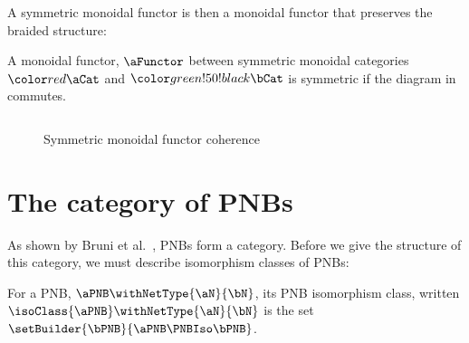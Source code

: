 A symmetric monoidal functor is then a monoidal functor that preserves the
braided structure:

\newcommand{\braidingArgsA}[2]{{\inA\braiding}_{\parens{#1,#2}}}
\newcommand{\braidingArgsB}[2]{{\inB\braiding}_{\parens{#1,#2}}}

\begin{definition}
    A monoidal functor, $\aFunctor$ between symmetric monoidal categories
    $\inA\aCat$ and $\inB\bCat$ is symmetric if the diagram in~
    commutes.
\end{definition}

\begin{figure}[ht]
    \[
    \]
    \centering
{}
\caption{Symmetric monoidal functor coherence}
\label{fig:braidingCoherence}
\end{figure}

\section{The category of PNBs} \label{sec:pnbCat}

As shown by {Bruni et al.}~\cite[Proposition 5.1]{Bruni2013}, PNBs form a
category. Before we give the structure of this category, we must describe
isomorphism classes of PNBs:

\begin{definition}
    For a PNB, $\aPNB \withNetType{\aN}{\bN}$, its PNB isomorphism class,
    written $\isoClass{\aPNB} \withNetType{\aN}{\bN}$ is the set
    $\setBuilder{\bPNB}{\aPNB \PNBIso \bPNB}$.
\end{definition}

